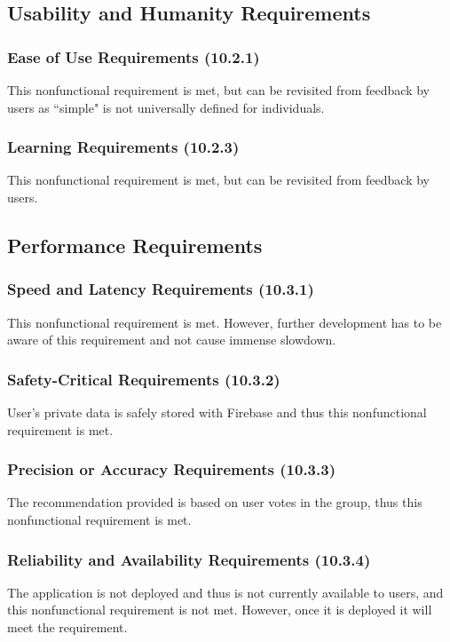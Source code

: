 \documentclass[12pt, titlepage]{article}
\begin{document}
\subsection{Usability and Humanity Requirements}
\subsubsection{Ease of Use Requirements (10.2.1)}
This nonfunctional requirement is met, but can be revisited from feedback by users as ``simple" is not universally defined for individuals.

\subsubsection{Learning Requirements (10.2.3)}
This nonfunctional requirement is met, but can be revisited from feedback by users.

\subsection{Performance Requirements}
\subsubsection{Speed and Latency Requirements (10.3.1)}
This nonfunctional requirement is met. However, further development has to be aware of this requirement and not cause immense slowdown.

\subsubsection{Safety-Critical Requirements (10.3.2)}
User's private data is safely stored with Firebase and thus this nonfunctional requirement is met.

\subsubsection{Precision or Accuracy Requirements (10.3.3)}
The recommendation provided is based on user votes in the group, thus this nonfunctional requirement is met.

\subsubsection{Reliability and Availability Requirements (10.3.4)}
The application is not deployed and thus is not currently available to users, and this nonfunctional requirement is not met. However, once it is deployed it will meet the requirement.
\end{document}
